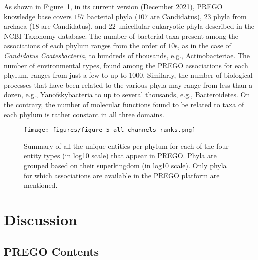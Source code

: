 {\begin{table}[h]
   \end{table}


   As shown in Figure~\ref{fig:prego-entities}, in its current version (December 2021), PREGO knowledge base covers $157$ bacterial phyla ($107$ are Candidatus), $23$ phyla from archaea ($18$ are Candidatus), and $22$ unicellular eukaryotic phyla described in the NCBI Taxonomy database. 
   The number of bacterial taxa present among the associations of each phylum ranges from the order of $10$s, as in the case of \textit{Candidatus Coatesbacteria}, to hundreds of thousands, e.g., Actinobacteriae. 
   The number of environmental types, found among the PREGO associations for each phylum, ranges from just a few to up to $1000$. 
   Similarly, the number of biological processes that have been related to the various phyla may range from less than a dozen, e.g., Yanofskybacteria to up to several thousands, e.g., Bacteroidetes. On the contrary, the number of molecular functions found to be related to taxa of each phylum is rather constant in all three domains.

   \begin{figure}
      \centering
      \texttt{[image: figures/figure\_5\_all\_channels\_ranks.png]}  
      \caption[Summary of the unique entities per phylum for each of the four entity types on PREGO]{Summary of all the unique entities per phylum for each of the four entity types (in log10 scale) that appear in PREGO. Phyla are grouped based on their superkingdom (in log10 scale). Only phyla for which associations are available in the PREGO platform are mentioned.
      }
      \label{fig:prego-entities}
   \end{figure}




\section{Discussion}
\label{sec:prego-discussion}

   \subsection{PREGO Contents}
   \label{subsec:prego-contents-disc}

}
